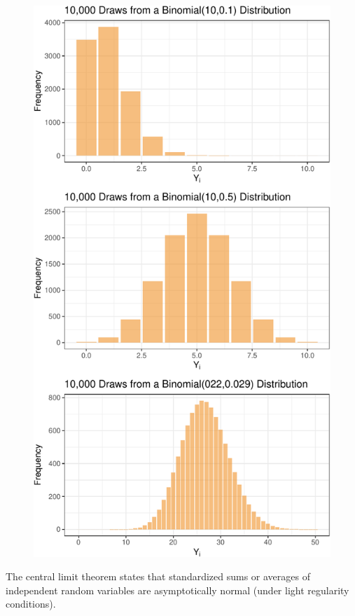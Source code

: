 \documentclass[
  letterpaper,
  DIV=11,
  numbers=noendperiod]{scrreport}
\begin{document}
\begin{figure}[H]

{\centering \includegraphics[width=1\textwidth,height=\textheight]{week8/week8_files/figure-pdf/unnamed-chunk-1-1.pdf}

}

\end{figure}

The central limit theorem states that standardized sums or averages of
independent random variables are asymptotically normal (under light
regularity conditions).
\end{document}
